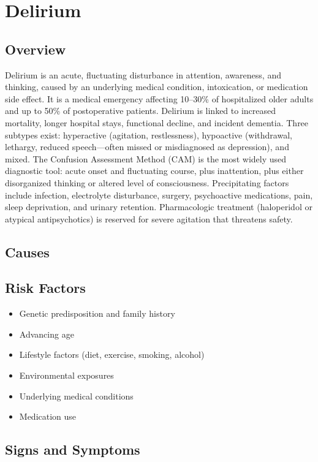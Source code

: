 \chapter{Delirium}
\label{sec:Delirium}

\section{Overview}
Delirium is an acute, fluctuating disturbance in attention, awareness, and thinking, caused by an underlying medical condition, intoxication, or medication side effect. It is a medical emergency affecting 10--30\% of hospitalized older adults and up to 50\% of postoperative patients. Delirium is linked to increased mortality, longer hospital stays, functional decline, and incident dementia. Three subtypes exist: hyperactive (agitation, restlessness), hypoactive (withdrawal, lethargy, reduced speech---often missed or misdiagnosed as depression), and mixed. The Confusion Assessment Method (CAM) is the most widely used diagnostic tool: acute onset and fluctuating course, plus inattention, plus either disorganized thinking or altered level of consciousness. Precipitating factors include infection, electrolyte disturbance, surgery, psychoactive medications, pain, sleep deprivation, and urinary retention. Pharmacologic treatment (haloperidol or atypical antipsychotics) is reserved for severe agitation that threatens safety.
\section{Causes}
\section{Risk Factors}

\begin{itemize}[noitemsep]
  \item Genetic predisposition and family history
  \item Advancing age
  \item Lifestyle factors (diet, exercise, smoking, alcohol)
  \item Environmental exposures
  \item Underlying medical conditions
  \item Medication use
\end{itemize}
\section{Signs and Symptoms}

